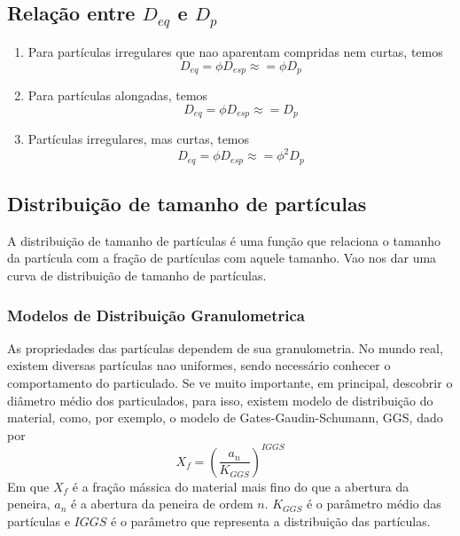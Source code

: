 \subsection{Relação entre \(D_{eq}\)  e \(D_p\) }
\begin{enumerate}
    \item {Para partículas irregulares que nao aparentam compridas nem curtas, temos
    \begin{equation}
        D_{eq} = \phi D_{esp} \approx = \phi D_p
    \end{equation}
    }
    \item {Para partículas alongadas, temos
    \begin{equation}
        D_{eq} = \phi D_{esp} \approx =  D_p
    \end{equation}
    }
    \item {Partículas irregulares, mas curtas, temos
    \begin{equation}
        D_{eq} = \phi D_{esp} \approx = \phi^2 D_p
    \end{equation}
    }
\end{enumerate}
\subsection{Distribuição de tamanho de partículas}
A distribuição de tamanho de partículas é uma função que relaciona o tamanho da partícula com a
fração de partículas com aquele tamanho. Vao nos dar uma curva de distribuição de tamanho de
partículas.\\
\subsubsection{Modelos de Distribuição Granulometrica}
As propriedades das partículas dependem de sua granulometria. No mundo real, existem diversas
partículas nao uniformes, sendo necessário conhecer o comportamento do particulado. Se ve muito
importante, em principal, descobrir o diâmetro médio dos particulados, para isso, existem modelo de
distribuição do material, como, por exemplo, o modelo de Gates-Gaudin-Schumann, GGS, dado por
\begin{equation}
    X_f = \left(\frac{a_n}{K_{GGS}}\right)^{IGGS}
\end{equation}
Em que \(X_f\) é a fração mássica do material mais fino do que a abertura da peneira, \(a_n\) é a
abertura da peneira de ordem \(n\). \(K_{GGS}\) é o parâmetro médio das partículas e \(IGGS\) é o
parâmetro que representa a distribuição das partículas.\par

